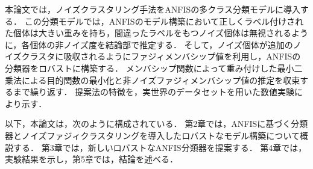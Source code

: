 \documentclass[fleqn]{ujarticle}
\begin{document}
本論文では，ノイズクラスタリング手法をANFISの多クラス分類モデルに導入する．
この分類モデルでは，ANFISのモデル構築において正しくラベル付けされた個体は大きい重みを持ち，間違ったラベルをもつノイズ個体は無視されるように，各個体の非ノイズ度を結論部で推定する．
そして，ノイズ個体が追加のノイズクラスタに吸収されるようにファジィメンバシップ値を利用し，ANFISの分類器をロバストに構築する．
メンバシップ関数によって重み付けした最小二乗法による目的関数の最小化と非ノイズファジィメンバシップ値の推定を収束するまで繰り返す．
提案法の特徴を，実世界のデータセットを用いた数値実験により示す．

以下，本論文は，次のように構成されている．
第2章では，ANFISに基づく分類器とノイズファジィクラスタリングを導入したロバストなモデル構築について概説する．
第3章では，新しいロバストなANFIS分類器を提案する．
第4章では，実験結果を示し，第5章では，結論を述べる．
\end{document}
